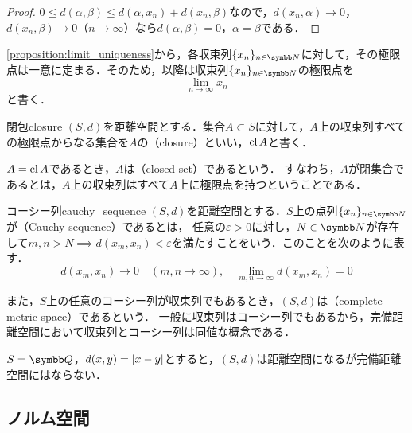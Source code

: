 \documentclass[../../main]{subfiles}
\begin{document}
\begin{proof}
  \(0\leq d(\alpha,\beta)\leq d(\alpha,x_n)+d(x_n,\beta)\)なので，\(d(x_n,\alpha)\to 0\)，\(d(x_n,\beta)\to 0\)（\(n\to\infty\)）なら\(d(\alpha,\beta)=0\)，\(\alpha=\beta\)である．
\end{proof}

\cref{proposition:limit_uniqueness}から，各収束列\(\seq{x_n}_{n\in\numset{N}}\)に対して，その極限点は一意に定まる．そのため，以降は収束列\(\seq{x_n}_{n\in\numset{N}}\)の極限点を
\[
  \lim_{n\to\infty}x_n
\]
と書く．

\begin{definition}{閉包}{closure}
  \((S,d)\)を距離空間とする．集合\(A\subset S\)に対して，\(A\)上の収束列すべての極限点からなる集合を\(A\)の（closure）といい，\(\operatorname{cl} A\)と書く\footnotemark ．
\end{definition}


\(A=\operatorname{cl} A\)であるとき，\(A\)は（closed set）であるという．
すなわち，\(A\)が閉集合であるとは，\(A\)上の収束列はすべて\(A\)上に極限点を持つということである．

\begin{definition}{コーシー列}{cauchy_sequence}
  \((S,d)\)を距離空間とする．\(S\)上の点列\(\seq{x_n}_{n\in\numset{N}}\)が（Cauchy sequence）であるとは，
  任意の\(\varepsilon>0\)に対し，\(N\in\numset{N}\)が存在して\(m,n>N\implies d(x_m,x_n)<\varepsilon\)を満たすことをいう．このことを次のように表す．
  \[
    d(x_m,x_n) \to 0\quad(m,n\to\infty),
    \quad\lim_{m,n\to\infty}d(x_m,x_n) = 0
  \]
\end{definition}

また，\(S\)上の任意のコーシー列が収束列でもあるとき，\((S,d)\)は（complete metric space）であるという．
一般に収束列はコーシー列でもあるから，完備距離空間において収束列とコーシー列は同値な概念である．

\begin{example}
  \(S=\numset{Q}\)，\(d(x,y)=\lvert x-y\rvert\)とすると，\((S,d)\)は距離空間になるが完備距離空間にはならない．
\end{example}

\subsection{ノルム空間}
\end{document}
